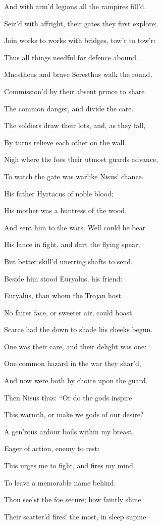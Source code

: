 And with arm’d legions all the rampires fill’d.

Seiz’d with affright, their gates they first explore;

Join works to works with bridges, tow’r to tow’r:

Thus all things needful for defence abound.

Mnestheus and brave Seresthus walk the round,

Commission’d by their absent prince to share

The common danger, and divide the care.

The soldiers draw their lots, and, as they fall,

By turns relieve each other on the wall.

Nigh where the foes their utmost guards advance,

To watch the gate was warlike Nisus’ chance.

His father Hyrtacus of noble blood;

His mother was a huntress of the wood,

And sent him to the wars. Well could he bear

His lance in fight, and dart the flying spear,

But better skill’d unerring shafts to send.

Beside him stood Euryalus, his friend:

Euryalus, than whom the Trojan host

No fairer face, or sweeter air, could boast.

Scarce had the down to shade his cheeks begun.

One was their care, and their delight was one:

One common hazard in the war they shar’d,

And now were both by choice upon the guard.

Then Nisus thus: “Or do the gods inspire

This warmth, or make we gods of our desire?

A gen’rous ardour boils within my breast,

Eager of action, enemy to rest:

This urges me to fight, and fires my mind

To leave a memorable name behind.

Thou see’st the foe secure; how faintly shine

Their scatter’d fires! the most, in sleep supine

